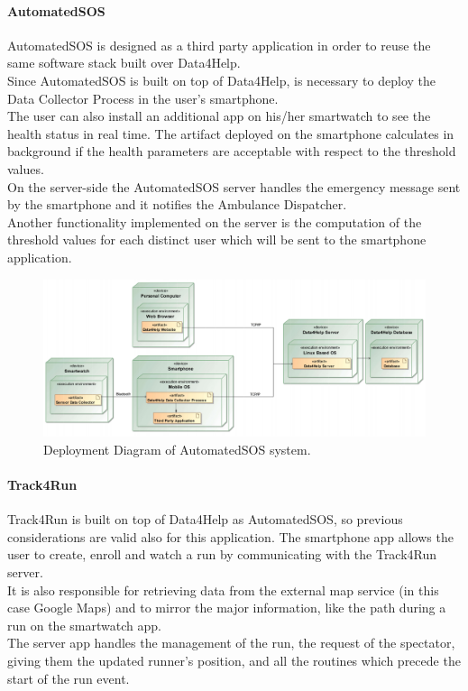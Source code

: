 \documentclass[a4paper]{article}
\begin{document}
\paragraph{AutomatedSOS}
AutomatedSOS is designed as a third party application in order to reuse the same software stack built over Data4Help. \\
Since AutomatedSOS is built on top of Data4Help, is necessary to deploy the Data Collector Process in the user's smartphone. \\
The user can also install an additional app on his/her smartwatch to see the health status in real time. The artifact deployed on the smartphone calculates in background if the health parameters are acceptable with respect to the threshold values.\\
On the server-side the AutomatedSOS server handles the emergency message sent by the smartphone and it notifies the Ambulance Dispatcher. \\
Another functionality implemented on the server is the computation of the threshold values for each distinct user which will be sent to the smartphone application.

\begin{figure}[H]
    \centering
    \includegraphics[width=\linewidth]{deploymentDiagram-AutomatedSOS}
    \caption{Deployment Diagram of AutomatedSOS system.}
    \label{fig:my_label}
\end{figure}

\paragraph{Track4Run}
Track4Run is built on top of Data4Help as AutomatedSOS, so previous considerations are valid also for this application. The smartphone app allows the user to create, enroll and watch a run by communicating with the Track4Run server. \\
It is also responsible for retrieving data from the external map service (in this case Google Maps) and to mirror the major information, like the path during a run on the smartwatch app. \\
The server app handles the management of the run, the request of the spectator, giving them the updated runner's position, and all the routines which precede the start of the run event.
\end{document}
